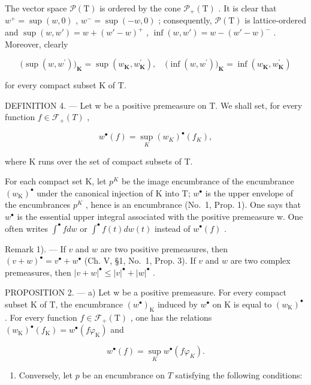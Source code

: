 The vector space \(\mathcal{P}(\mathrm{T})\) is ordered by the cone \(\mathcal{P}_{+}(\mathrm{T})\) . It is clear that \(w^{+} = \sup(w,0)\) , \(w^{-} = \sup(-w,0)\) ; consequently, \(\mathcal{P}(\mathrm{T})\) is lattice-ordered and \(\sup(w,w') = w + (w' - w)^{+}\) , \(\inf(w,w') = w - (w' - w)^{-}\) . Moreover, clearly

\[
\big (\sup (w, w ^ {\prime}) \big) _ {\mathbf {K}} = \sup (w _ {\mathbf {K}}, w _ {\mathbf {K}} ^ {\prime}), \quad \big (\inf (w, w ^ {\prime}) \big) _ {\mathbf {K}} = \inf (w _ {\mathbf {K}}, w _ {\mathbf {K}} ^ {\prime})
\]

for every compact subset K of T.

DEFINITION 4. --- Let w be a positive premeasure on T. We shall set, for every function \(f \in \mathcal{F}_{+}(T)\) ,

\[
w ^ {\bullet} (f) = \sup _ {K} \left(w _ {K}\right) ^ {\bullet} \left(f _ {K}\right),\tag{1}
\]

where K runs over the set of compact subsets of T.

For each compact set K, let \(p^{K}\) be the image encumbrance of the encumbrance \((w_{\mathrm{K}})^{\bullet}\) under the canonical injection of K into T; \(w^{\bullet}\) is the upper envelope of the encumbrances \(p^{K}\) , hence is an encumbrance (No.~1, Prop. 1). One says that \(w^{\bullet}\) is the essential upper integral associated with the positive premeasure w. One often writes \(\int^{\bullet} f dw\) or \(\int^{\bullet} f(t) dw(t)\) instead of \(w^{\bullet}(f)\) .

Remark 1). --- If \(v\) and \(w\) are two positive premeasures, then \((v + w)^{\bullet} = v^{\bullet} + w^{\bullet}\) (Ch. V, §1, No.~1, Prop. 3). If \(v\) and \(w\) are two complex premeasures, then \(|v + w|^{\bullet} \leqslant |v|^{\bullet} + |w|^{\bullet}\) .

PROPOSITION 2. --- a) Let w be a positive premeasure. For every compact subset K of T, the encumbrance \((w^{\bullet})_{\mathrm{K}}\) induced by \(w^{\bullet}\) on K is equal to \((w_{\mathrm{K}})^{\bullet}\) . For every function \(f \in \mathcal{F}_{+}(\mathrm{T})\) , one has the relations \((w_{\mathrm{K}})^{\bullet}(f_{\mathrm{K}}) = w^{\bullet}(f\varphi_{\mathrm{K}})\) and

\[
w ^ {\bullet} (f) = \sup _ {K} w ^ {\bullet} (f \varphi_ {K}).\tag{2}
\]

\begin{enumerate}
\def\labelenumi{\alph{enumi})}
\setcounter{enumi}{1}
\tightlist
\item
  Conversely, let \(p\) be an encumbrance on \(T\) satisfying the following conditions:
\end{enumerate}

